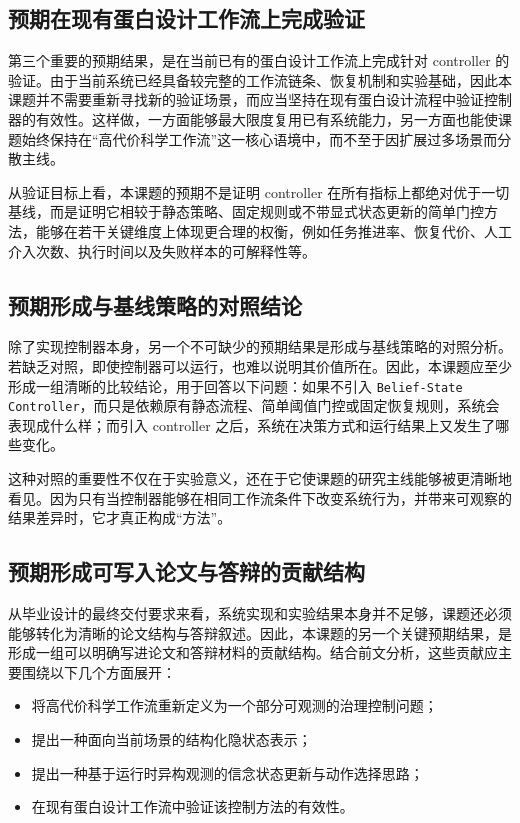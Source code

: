 \subsection{预期在现有蛋白设计工作流上完成验证}

第三个重要的预期结果，是在当前已有的蛋白设计工作流上完成针对 controller 的验证。由于当前系统已经具备较完整的工作流链条、恢复机制和实验基础，因此本课题并不需要重新寻找新的验证场景，而应当坚持在现有蛋白设计流程中验证控制器的有效性。这样做，一方面能够最大限度复用已有系统能力，另一方面也能使课题始终保持在“高代价科学工作流”这一核心语境中，而不至于因扩展过多场景而分散主线。

从验证目标上看，本课题的预期不是证明 controller 在所有指标上都绝对优于一切基线，而是证明它相较于静态策略、固定规则或不带显式状态更新的简单门控方法，能够在若干关键维度上体现更合理的权衡，例如任务推进率、恢复代价、人工介入次数、执行时间以及失败样本的可解释性等。

\subsection{预期形成与基线策略的对照结论}

除了实现控制器本身，另一个不可缺少的预期结果是形成与基线策略的对照分析。若缺乏对照，即使控制器可以运行，也难以说明其价值所在。因此，本课题应至少形成一组清晰的比较结论，用于回答以下问题：如果不引入 \texttt{Belief-State Controller}，而只是依赖原有静态流程、简单阈值门控或固定恢复规则，系统会表现成什么样；而引入 controller 之后，系统在决策方式和运行结果上又发生了哪些变化。

这种对照的重要性不仅在于实验意义，还在于它使课题的研究主线能够被更清晰地看见。因为只有当控制器能够在相同工作流条件下改变系统行为，并带来可观察的结果差异时，它才真正构成“方法”。

\subsection{预期形成可写入论文与答辩的贡献结构}

从毕业设计的最终交付要求来看，系统实现和实验结果本身并不足够，课题还必须能够转化为清晰的论文结构与答辩叙述。因此，本课题的另一个关键预期结果，是形成一组可以明确写进论文和答辩材料的贡献结构。结合前文分析，这些贡献应主要围绕以下几个方面展开：
\begin{itemize}
	\item 将高代价科学工作流重新定义为一个部分可观测的治理控制问题；
	\item 提出一种面向当前场景的结构化隐状态表示；
	\item 提出一种基于运行时异构观测的信念状态更新与动作选择思路；
	\item 在现有蛋白设计工作流中验证该控制方法的有效性。
\end{itemize}

